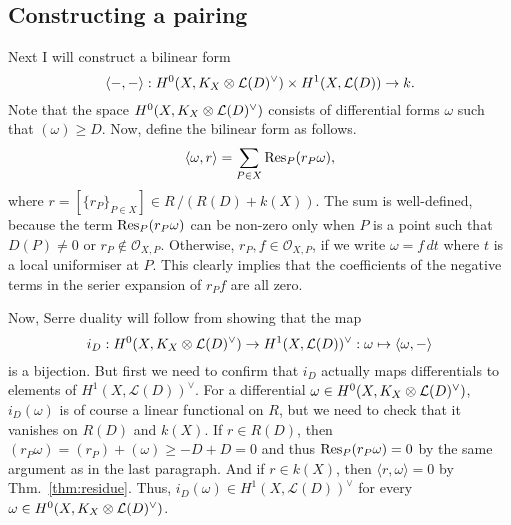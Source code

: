 \subsection{Constructing a pairing}
Next I will construct a bilinear form
\[
  \langle -,-\rangle:H^0(X,K_X\otimes\mathcal{L}(D)^{\vee})\times H^{1}(X,\mathcal{L}(D))\to k.
\]
Note that the space $H^0(X,K_X\otimes\mathcal{L}(D)^{\vee})$ consists of differential forms $\omega$
such that $(\omega)\geq D$.
Now, define the bilinear form as follows.
\[
  \langle\omega,r\rangle=\sum_{P\in X}\operatorname{Res}_{P}(r_{P}\omega),
\]
where $r=[\{r_{P}\}_{P\in X}]\in R\,/\left(R(D)+k(X)\right)$. The sum is
well-defined, because the term $\operatorname{Res}_{P}(r_{P}\omega)$ can be non-zero only
when $P$ is a point such that $D(P)\neq 0$ or $r_{P}\not\in\mathscr{O}_{X,P}$.
Otherwise, $r_{P},f\in\mathscr{O}_{X,P}$, if we write $\omega=f\,dt$
where $t$ is a local uniformiser at $P$. This clearly implies that the
coefficients of the negative terms in the serier expansion of $r_{P}f$
are all zero.

Now, Serre duality will follow from showing that the map
\[
  i_{D}:H^0(X,K_X\otimes\mathcal{L}(D)^{\vee})\to H^{1}(X,\mathcal{L}(D))^{\vee}
  :\omega\mapsto\langle\omega,-\rangle
\]
is a bijection. But first we need to confirm that $i_{D}$ actually maps
differentials to elements of $H^{1}(X,\mathcal{L}(D))^{\vee}$. For a
differential $\omega\in H^0(X,K_X\otimes\mathcal{L}(D)^{\vee})$, $i_{D}(\omega)$ is of course a linear
functional on $R$, but we need to check that it vanishes on $R(D)$ and
$k(X)$. If $r\in R(D)$, then $(r_{P}\omega)=(r_{P})+(\omega)\geq -D+D=0$
and thus $\operatorname{Res}_{P}(r_{P}\omega)=0$ by the same argument as in the last
paragraph. And if $r\in k(X)$, then $\langle r,\omega\rangle=0$ by
Thm.~\ref{thm:residue}. Thus, $i_{D}(\omega)\in H^{1}(X,\mathcal{L}(D))^{\vee}$
for every $\omega\in H^0(X,K_X\otimes\mathcal{L}(D)^{\vee})$.


